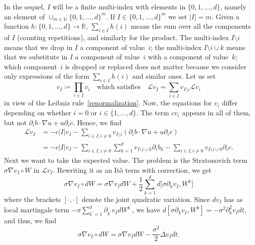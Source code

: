 \documentclass[a4paper,10pt]{article}
\newcommand\1{\mathbbm{1}}
\numberwithin{equation}{section}
\begin{document}
In the sequel, $I$ will be a finite multi-index with elements in $\{0,1,\ldots,d\}$, namely an element of $\cup_{m\in\mathbb{N}}\{0,1,\ldots, d\}^{m}$. If $I\in\{0,1,\ldots, d\}^{m}$ we set $\left\vert I\right\vert =m$. Given a function $h \colon \{0,1,\ldots, d\}\rightarrow\mathbb{R}$, $\sum_{i\in I}h(i)$ means the sum over all the components of $I$ (counting repetitions), and similarly for the product. The multi-index $I\setminus i$ means that we drop in $I$ a component of value~$i$; the multi-index $I\setminus i\cup k$ means that we substitute in $I$ a component of value~$i$ with a component of value~$k$; which component~$i$ is dropped or replaced does not matter because we consider only expressions of the form $\sum_{i\in I}h(i)$ and similar ones. Let us set
\begin{equation*}
v_{I}\coloneqq \prod_{i\in I}v_{i} \quad \text{which satisfies} \quad \mathcal{L}v_{I}=\sum_{i\in I}v_{I\setminus i}\mathcal{L}v_{i}
\end{equation*}
in view of the Leibniz rule~\eqref{renormalization}. Now, the equations for $v_{i}$ differ depending on whether $i=0$ or $i \in \{1,\ldots,d\}$. The
term $cv_{i}$ appears in all of them, but not $\partial_{i}b\cdot\nabla
u+u\partial_{i}c$. Hence, we find 
\begin{align*}
\mathcal{L}v_{I}  &  =-c\left\vert I\right\vert v_{I}-\sum_{i\in I,i\neq
0}v_{I\setminus i}(\partial_{i}b\cdot\nabla u+u\partial_{i}c) \\
&  =-c\left\vert I\right\vert v_{I}-\sum_{i\in I,i\neq0}\sum_{k=1} 
^{d}v_{I\setminus i\cup k}\partial_{i}b_{k}-\sum_{i\in I,i\neq0}v_{I\setminus
i\cup0}\partial_{i}c.
\end{align*}
Next we want to take the expected value. The problem is the Stratonovich term $\sigma\nabla
v_{I}\circ\dot{W}$ in $\mathcal{L}v_{I}$. Rewriting it as an  It\^{o} term with correction, we get 
\begin{equation*}
\sigma\nabla v_{I}\circ dW=\sigma\nabla v_{I}dW+\frac{1}{2}\sum_{k=1} 
^{d}d\big[  \sigma\partial_{k}v_{I},W^{k}\big]
\end{equation*}
where the brackets $[\cdot,\cdot]$ denote the joint quadratic variation. Since $dv_{I}$ has as local martingale term $-\sigma\sum_{k^{\prime}=1}^{d}\partial_{k^{\prime}} v_{I}dW^{k^{\prime}}$, we have $d[\sigma\partial_{k}v_{I},W^{k}]=-\sigma^{2}\partial_{k}^{2}v_{I}dt$, and thus, we find
\begin{equation*}
\sigma\nabla v_{I}\circ dW=\sigma\nabla v_{I}dW-\frac{\sigma^{2}}{2}\Delta
v_{I}dt.
\end{equation*}
\end{document}
